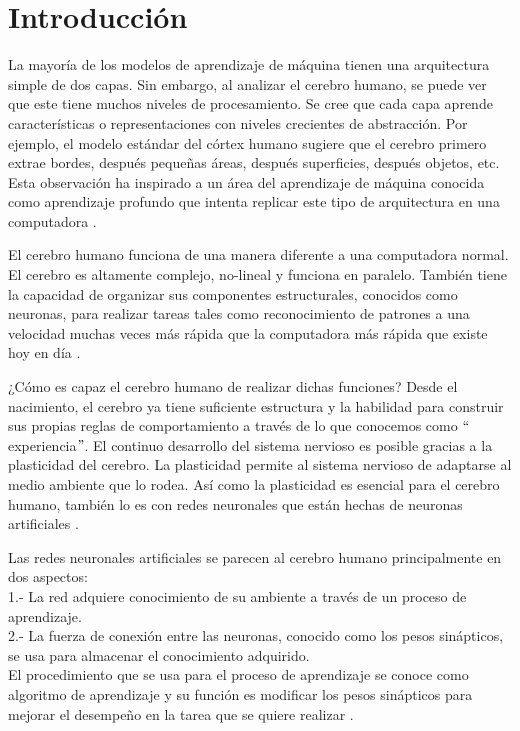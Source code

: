 \section{Introducción}
La mayoría de los modelos de aprendizaje de máquina tienen una arquitectura simple de dos capas. Sin embargo, al analizar el cerebro humano, se puede ver que este tiene muchos niveles de procesamiento. Se cree que cada capa aprende características o representaciones con niveles crecientes de abstracción. Por ejemplo, el modelo estándar del córtex humano sugiere que el cerebro primero extrae bordes, después pequeñas áreas, después superficies, después objetos, etc. Esta observación ha inspirado a un área del aprendizaje de máquina conocida como aprendizaje profundo que intenta replicar este tipo de arquitectura en una computadora \cite{Murphy:2012:MLP:2380985}.

\vspace{1em}

El cerebro humano funciona de una manera diferente a una computadora normal. El cerebro es altamente complejo, no-lineal y funciona en paralelo. También tiene la capacidad de organizar sus componentes estructurales, conocidos como neuronas, para realizar tareas tales como reconocimiento de patrones a una velocidad muchas veces más rápida que la computadora más rápida que existe hoy en día \cite{Haykin:1998:NNC:521706}.

\vspace{1em}

¿Cómo es capaz el cerebro humano de realizar dichas funciones? Desde el nacimiento, el cerebro ya tiene suficiente estructura y la habilidad para construir sus propias reglas de comportamiento a través de lo que conocemos como $``$experiencia$"$. El continuo desarrollo del sistema nervioso es posible gracias a la plasticidad del cerebro. La plasticidad permite al sistema nervioso de adaptarse al medio ambiente que lo rodea. Así como la plasticidad es esencial para el cerebro humano, también lo es con redes neuronales que están hechas de neuronas artificiales \cite{Haykin:1998:NNC:521706}.

\vspace{1em}

Las redes neuronales artificiales se parecen al cerebro humano principalmente en dos aspectos: \\
1.- La red adquiere conocimiento de su ambiente a través de un proceso de aprendizaje.\\
2.- La fuerza de conexión entre las neuronas, conocido como los pesos sinápticos, se usa para almacenar el conocimiento adquirido. \\
El procedimiento que se usa para el proceso de aprendizaje se conoce como algoritmo de aprendizaje y su función es modificar los pesos sinápticos para mejorar el desempeño en la tarea que se quiere realizar \cite{Haykin:1998:NNC:521706}.

